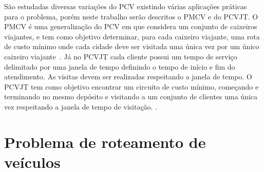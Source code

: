 São estudadas diversas variações do \ac{PCV} existindo várias aplicações práticas para o problema, porém neste trabalho serão descritos o \ac{PMCV} e do \ac{PCVJT}. O \ac{PMCV} é uma generalização do \ac{PCV} em que considera um conjunto de caixeiros viajantes, e tem como objetivo determinar, para cada caixeiro viajante, uma rota de custo mínimo onde cada cidade deve ser visitada uma única vez por um único caixeiro viajante~\cite{meng:2012}.  Já no \ac{PCVJT} cada cliente possui um tempo de serviço delimitado por uma janela de tempo definindo o tempo de início e fim do atendimento. As visitas devem ser realizadas respeitando a janela de tempo. O \ac{PCVJT} tem como objetivo encontrar um circuito de custo mínimo, começando e terminando no mesmo depósito e visitando a um conjunto de clientes uma única vez respeitando a janela de tempo de visitação. \cite{urrutia:2010}.



\section{Problema de roteamento de veículos}

